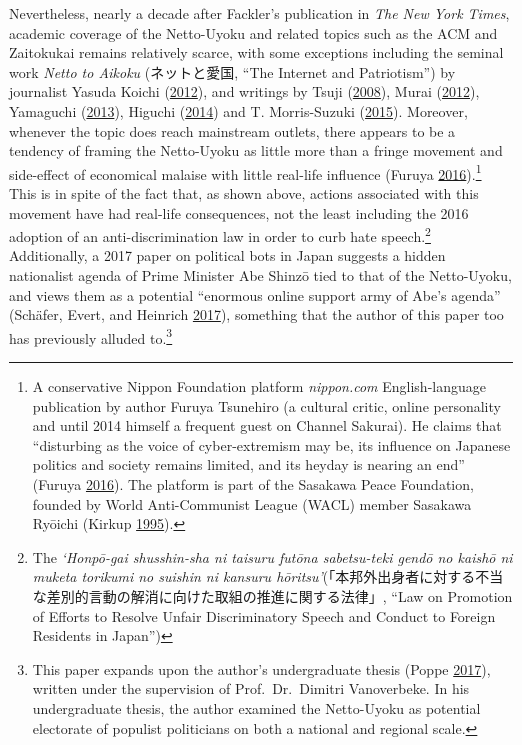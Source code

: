 \documentclass[10pt,british,A4paper,,openany]{memoir}
\begin{document}
Nevertheless, nearly a decade after Fackler's publication in \emph{The
New York Times}, academic coverage of the Netto-Uyoku and related topics
such as the ACM and Zaitokukai remains relatively scarce, with some
exceptions including the seminal work \emph{Netto to Aikoku}
(ネットと愛国, ``The Internet and Patriotism'') by journalist Yasuda
Koichi (\protect\hyperlink{ref-yasuda_eng:_2012}{2012}), and writings by
Tsuji (\protect\hyperlink{ref-tsuji_eng:_2008}{2008}), Murai
(\protect\hyperlink{ref-murai_net_2012}{2012}), Yamaguchi
(\protect\hyperlink{ref-yamaguchi_xenophobia_2013}{2013}), Higuchi
(\protect\hyperlink{ref-higuchi_japans_2014}{2014}) and T. Morris-Suzuki
(\protect\hyperlink{ref-morris-suzuki_beyond_2015}{2015}). Moreover,
whenever the topic does reach mainstream outlets, there appears to be a
tendency of framing the Netto-Uyoku as little more than a fringe
movement and side-effect of economical malaise with little real-life
influence (Furuya
\protect\hyperlink{ref-furuya_roots_2016}{2016}).\footnote{A
  conservative Nippon Foundation platform \emph{nippon.com}
  English-language publication by author Furuya Tsunehiro (a cultural
  critic, online personality and until 2014 himself a frequent guest on
  Channel Sakurai). He claims that ``disturbing as the voice of
  cyber-extremism may be, its influence on Japanese politics and society
  remains limited, and its heyday is nearing an end'' (Furuya
  \protect\hyperlink{ref-furuya_roots_2016}{2016}). The platform is part
  of the Sasakawa Peace Foundation, founded by World Anti-Communist
  League (WACL) member Sasakawa Ryōichi (Kirkup
  \protect\hyperlink{ref-kirkup_obituary:_1995}{1995}).} This is in
spite of the fact that, as shown above, actions associated with this
movement have had real-life consequences, not the least including the
2016 adoption of an anti-discrimination law in order to curb hate
speech.\footnote{The \emph{`Honpō-gai shusshin-sha ni taisuru futōna
  sabetsu-teki gendō no kaishō ni muketa torikumi no suishin ni kansuru
  hōritsu'}(「本邦外出身者に対する不当な差別的言動の解消に向けた取組の推進に関する法律」,
  ``Law on Promotion of Efforts to Resolve Unfair Discriminatory Speech
  and Conduct to Foreign Residents in Japan'')} Additionally, a 2017
paper on political bots in Japan suggests a hidden nationalist agenda of
Prime Minister Abe Shinzō tied to that of the Netto-Uyoku, and views
them as a potential ``enormous online support army of Abe's agenda''
(Schäfer, Evert, and Heinrich
\protect\hyperlink{ref-schafer_japans_2017}{2017}), something that the
author of this paper too has previously alluded to.\footnote{This paper
  expands upon the author's undergraduate thesis (Poppe
  \protect\hyperlink{ref-poppe_digitaal_2017}{2017}), written under the
  supervision of Prof.~Dr.~Dimitri Vanoverbeke. In his undergraduate
  thesis, the author examined the Netto-Uyoku as potential electorate of
  populist politicians on both a national and regional scale.}
\end{document}
